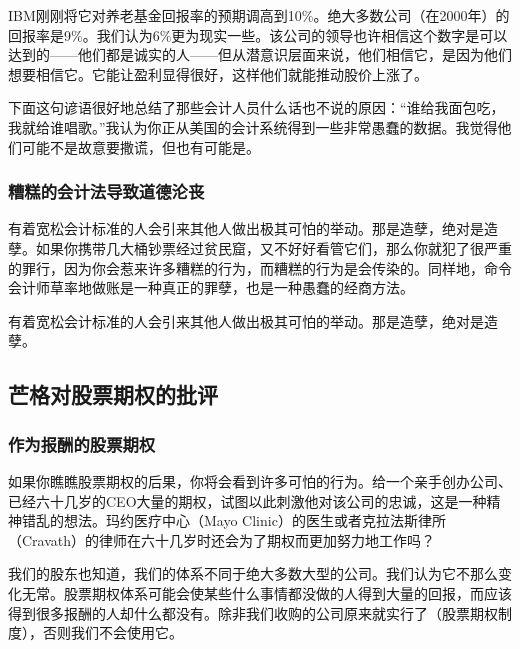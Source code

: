 IBM刚刚将它对养老基金回报率的预期调高到10\%。绝大多数公司（在2000年）的回报率是9\%。我们认为6\%更为现实一些。该公司的领导也许相信这个数字是可以达到的——他们都是诚实的人——但从潜意识层面来说，他们相信它，是因为他们想要相信它。它能让盈利显得很好，这样他们就能推动股价上涨了。
\par

下面这句谚语很好地总结了那些会计人员什么话也不说的原因：“谁给我面包吃，我就给谁唱歌。”我认为你正从美国的会计系统得到一些非常愚蠢的数据。我觉得他们可能不是故意要撒谎，但也有可能是。
\par

\subsubsection*{糟糕的会计法导致道德沦丧}

有着宽松会计标准的人会引来其他人做出极其可怕的举动。那是造孽，绝对是造孽。如果你携带几大桶钞票经过贫民窟，又不好好看管它们，那么你就犯了很严重的罪行，因为你会惹来许多糟糕的行为，而糟糕的行为是会传染的。同样地，命令会计师草率地做账是一种真正的罪孽，也是一种愚蠢的经商方法。
\par

\begin{WisdomBox}
\par

有着宽松会计标准的人会引来其他人做出极其可怕的举动。那是造孽，绝对是造孽。
\par
\end{WisdomBox}

\subsection*{芒格对股票期权的批评}

\subsubsection*{作为报酬的股票期权}

如果你瞧瞧股票期权的后果，你将会看到许多可怕的行为。给一个亲手创办公司、已经六十几岁的CEO大量的期权，试图以此刺激他对该公司的忠诚，这是一种精神错乱的想法。玛约医疗中心（Mayo Clinic）的医生或者克拉法斯律所（Cravath）的律师在六十几岁时还会为了期权而更加努力地工作吗？
\par

我们的股东也知道，我们的体系不同于绝大多数大型的公司。我们认为它不那么变化无常。股票期权体系可能会使某些什么事情都没做的人得到大量的回报，而应该得到很多报酬的人却什么都没有。除非我们收购的公司原来就实行了（股票期权制度），否则我们不会使用它。
\par

